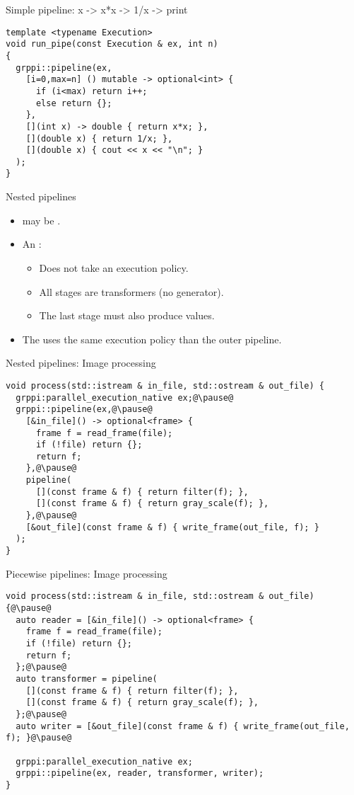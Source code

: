 \begin{frame}[t,fragile]{Simple pipeline: x -> x*x -> 1/x -> print}
\begin{lstlisting}
template <typename Execution>
void run_pipe(const Execution & ex, int n)
{
  grppi::pipeline(ex,
    [i=0,max=n] () mutable -> optional<int> {
      if (i<max) return i++;
      else return {};
    },
    [](int x) -> double { return x*x; },
    [](double x) { return 1/x; },
    [](double x) { cout << x << "\n"; }
  );
}
\end{lstlisting}
\end{frame}

\begin{frame}[t,fragile]{Nested pipelines}
\begin{itemize}
  \item {} may be .
  \vfill
  \item An :
    \begin{itemize}
      \item Does not take an execution policy.
      \item All stages are transformers (no generator).
      \item The last stage must also produce values.
    \end{itemize}
  \vfill
  \item The  uses the same execution policy than the outer
        pipeline.
\end{itemize}
\end{frame}

\begin{frame}[t,fragile]{Nested pipelines: Image processing}
\begin{lstlisting}[escapechar=@]
void process(std::istream & in_file, std::ostream & out_file) {
  grppi:parallel_execution_native ex;@\pause@
  grppi::pipeline(ex,@\pause@
    [&in_file]() -> optional<frame> {
      frame f = read_frame(file);
      if (!file) return {};
      return f;
    },@\pause@
    pipeline(
      [](const frame & f) { return filter(f); },
      [](const frame & f) { return gray_scale(f); },
    },@\pause@
    [&out_file](const frame & f) { write_frame(out_file, f); }
  );
}
\end{lstlisting}
\end{frame}

\begin{frame}[t,fragile]{Piecewise pipelines: Image processing}
\vspace{-.5em}
\begin{lstlisting}[escapechar=@]
void process(std::istream & in_file, std::ostream & out_file) {@\pause@
  auto reader = [&in_file]() -> optional<frame> {
    frame f = read_frame(file);
    if (!file) return {};
    return f;
  };@\pause@
  auto transformer = pipeline(
    [](const frame & f) { return filter(f); },
    [](const frame & f) { return gray_scale(f); },
  };@\pause@
  auto writer = [&out_file](const frame & f) { write_frame(out_file, f); }@\pause@

  grppi:parallel_execution_native ex;
  grppi::pipeline(ex, reader, transformer, writer);
}
\end{lstlisting}
\end{frame}
